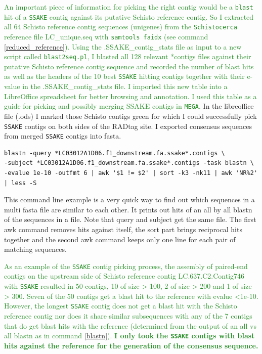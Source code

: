 \documentclass{article}\usepackage[]{graphicx}\usepackage[]{color}
\newcommand{\roger}[1]{ \textcolor[named]{ForestGreen}{#1} }
\begin{document}
\roger{An important piece of information for picking the right contig would be a \texttt{blast} hit of a \texttt{SSAKE} contig against its putative Schisto reference contig. So I extracted all 64 Schisto reference contig sequences (unigenes) from the \texttt{Schistocerca} reference file \textsf{LC\_unique.seq} with \texttt{samtools faidx} (see command \ref{reduced_reference}). Using the \textsf{.SSAKE\_contig\_stats} file as input to a new script called \texttt{blast2seq.pl}, I blasted all 128 relevant *contigs files against their putative Schisto reference contig sequence and recorded the number of blast hits as well as the headers of the 10 best \texttt{SSAKE} hitting contigs together with their e-value in the \textsf{.SSAKE\_contig\_stats} file. I imported this new table into a LibreOffice spreadsheet for better browsing and annotation. I used this table as a guide for picking and possibly merging SSAKE contigs in \texttt{MEGA}.} In the libreoffice file (.ods) I marked those Schisto contigs green for which I could successfully pick \texttt{SSAKE} contigs on both sides of the RADtag site. I exported consensus sequences from merged \texttt{SSAKE} contigs into fasta.

\begin{command}
\captionsetup{type=command}
\begin{Verbatim}
blastn -query *LC03012A1D06.f1_downstream.fa.ssake*.contigs \
-subject *LC03012A1D06.f1_downstream.fa.ssake*.contigs -task blastn \
-evalue 1e-10 -outfmt 6 | awk '$1 != $2' | sort -k3 -nk11 | awk 'NR%2' | less -S
\end{Verbatim}
\caption{\small This command line example is a very quick way to find out which sequences in a multi fasta file are similar to each other. It prints out hits of an all by all blastn of the sequences in a file. Note that query and subject get the same file. The first awk command removes hits against itself, the sort part brings reciprocal hits together and the second awk command keeps only one line for each pair of matching sequences.}
\label{blastn}
\end{command}

\roger{As an example of the \texttt{SSAKE} contig picking process, the assembly of paired-end contigs on the upstream side of Schisto reference contig LC.637.C2.Contig746 with \texttt{SSAKE} resulted in 50 contigs, 10 of size > 100, 2 of size > 200 and 1 of size > 300. Seven of the 50 contigs get a blast hit to the reference with evalue <1e-10. However, the longest \texttt{SSAKE} contig does not get a blast hit with the Schisto reference contig nor does it share similar subsequences with any of the 7 contigs that do get blast hits with the reference (determined from the output of an all vs all blastn as in command \ref{blastn}). \textbf{I only took the \texttt{SSAKE} contigs with blast hits against the reference for the generation of the consensus sequence.} }
\end{document}
